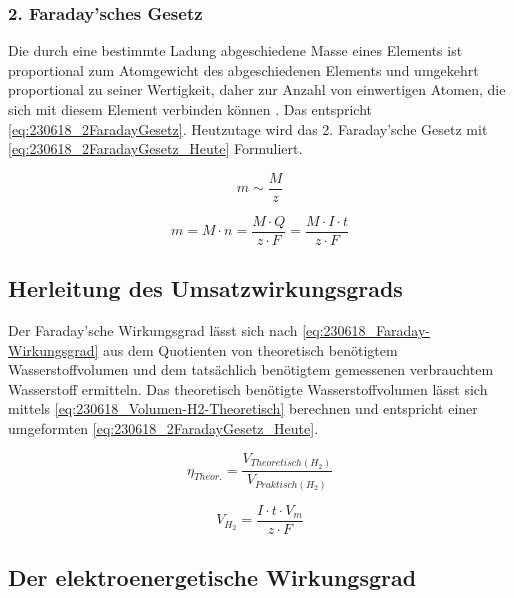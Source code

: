 \subsubsection{2. Faraday'sches Gesetz}

Die durch eine bestimmte Ladung abgeschiedene Masse eines Elements ist proportional zum Atomgewicht des abgeschiedenen Elements und umgekehrt proportional zu seiner Wertigkeit, daher zur Anzahl von einwertigen Atomen, die sich mit diesem Element verbinden können \cite{Faraday_G}. Das entspricht \autoref{eq:230618_2FaradayGesetz}.
Heutzutage wird das 2. Faraday'sche Gesetz mit \autoref{eq:230618_2FaradayGesetz_Heute} Formuliert.

\begin{equation}
    m \sim \frac{M}{z}
    \label{eq:230618_2FaradayGesetz}
\end{equation}

\begin{equation}
    m = M \cdot n = \frac{M \cdot Q}{z \cdot F} = \frac{M \cdot I \cdot t}{z \cdot F}
    \label{eq:230618_2FaradayGesetz_Heute}
\end{equation}

\subsection{Herleitung des Umsatzwirkungsgrads}

Der Faraday'sche Wirkungsgrad lässt sich nach \autoref{eq:230618_Faraday-Wirkungsgrad} aus dem Quotienten von theoretisch benötigtem Wasserstoffvolumen und dem tatsächlich benötigtem gemessenen verbrauchtem Wasserstoff ermitteln.
Das theoretisch benötigte Wasserstoffvolumen lässt sich mittels \autoref{eq:230618_Volumen-H2-Theoretisch} berechnen und entspricht einer umgeformten \autoref{eq:230618_2FaradayGesetz_Heute}.

\begin{equation}
    \eta_{Theor.} = \frac{V_{Theoretisch(H_2)}}{V_{Praktisch(H_2)}}
    \label{eq:230618_Faraday-Wirkungsgrad}
\end{equation}

\begin{equation}
    V_{H_2} = \frac{I \cdot t \cdot V_m}{z \cdot F}
    \label{eq:230618_Volumen-H2-Theoretisch}
\end{equation}

\subsection{Der elektroenergetische Wirkungsgrad}

